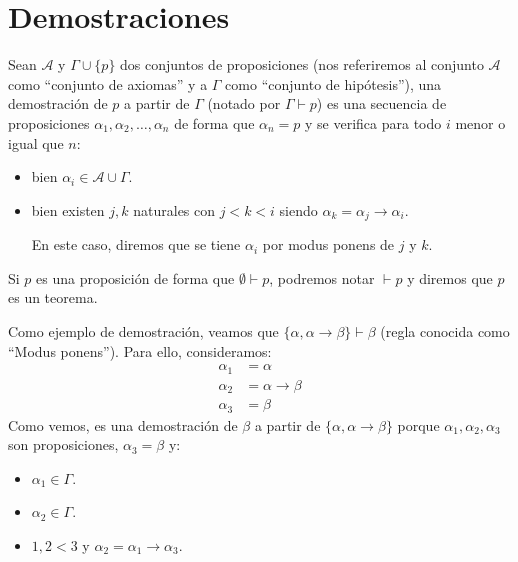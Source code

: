 \section{Demostraciones}
\begin{definicion}[Demostración]
    Sean $\mathcal{A}$ y $\Gamma\cup\{p\}$ dos conjuntos de proposiciones (nos referiremos al conjunto $\mathcal{A}$ como ``conjunto de axiomas'' y a $\Gamma$ como ``conjunto de hipótesis''), una demostración de $p$ a partir de $\Gamma$ (notado por $\Gamma\vdash p$) es una secuencia de proposiciones $\alpha_1,\alpha_2,\ldots,\alpha_n$ de forma que $\alpha_n=p$ y se verifica para todo $i$ menor o igual que $n$:
    \begin{itemize}
        \item bien $\alpha_i \in \mathcal{A}\cup\Gamma$.
        \item bien existen $j,k$ naturales con $j<k<i$ siendo $\alpha_k = \alpha_j\to \alpha_i$.

        En este caso, diremos que se tiene $\alpha_i$ por modus ponens de $j$ y $k$.
    \end{itemize}
\end{definicion}

\begin{notacion}
    Si $p$ es una proposición de forma que $\emptyset \vdash p$, podremos notar $\vdash p$ y diremos que $p$ es un teorema.
\end{notacion}

\begin{ejemplo}
    Como ejemplo de demostración, veamos que $\{\alpha,\alpha\to\beta\}\vdash \beta$ (regla conocida como ``Modus ponens''). Para ello, consideramos:
    \begin{align*}
        \alpha_1 &= \alpha \\
        \alpha_2 &= \alpha\to\beta \\
        \alpha_3 &= \beta
    \end{align*}
    Como vemos, es una demostración de $\beta$ a partir de $\{\alpha,\alpha\to\beta\}$ porque $\alpha_1,\alpha_2,\alpha_3$ son proposiciones, $\alpha_3=\beta$ y:
    \begin{itemize}
        \item $\alpha_1\in \Gamma$.
        \item $\alpha_2\in \Gamma$.
        \item $1,2<3$ y $\alpha_2 = \alpha_1\to \alpha_3$.
    \end{itemize}
\end{ejemplo}

